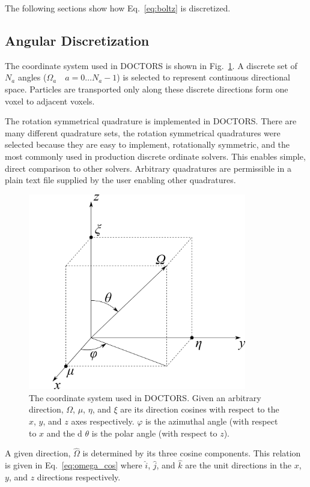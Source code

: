 The following sections show how Eq.~\ref{eq:boltz} is discretized.

\subsection{Angular Discretization}
The coordinate system used in DOCTORS is shown in Fig.~\ref{fig:coord_sys}. A discrete set of $N_a$ angles ($\Omega_{a} \quad a = 0 \ldots N_a-1$) is selected to represent continuous directional space. Particles are transported only along these discrete directions form one voxel to adjacent voxels.

The rotation symmetrical quadrature is implemented in DOCTORS. There are many different quadrature sets, the rotation symmetrical quadratures were selected because they are easy to implement, rotationally symmetric, and the most commonly used in production discrete ordinate solvers. This enables simple, direct comparison to other solvers. Arbitrary quadratures are permissible in a plain text file supplied by the user enabling other quadratures.

\begin{figure}[tb]
  \begin{center}
   \includegraphics[width=3.75in]{figs/coord_sys}
  \end{center}
  \caption{The coordinate system used in DOCTORS. Given an arbitrary direction, $\Omega$, $\mu$, $\eta$, and $\xi$ are its direction cosines with respect to the $x$, $y$, and $z$ axes respectively. $\varphi$ is the azimuthal angle (with respect to $x$ and the d $\theta$ is the polar angle (with respect to $z$).}
\label{fig:coord_sys}
\end{figure}%

A given direction, $\hat{\Omega}$ is determined by its three cosine components. This relation is given in Eq.~\ref{eq:omega_cos} where $\hat{i}$, $\hat{j}$, and $\hat{k}$ are the unit directions in the $x$, $y$, and $z$ directions respectively.

